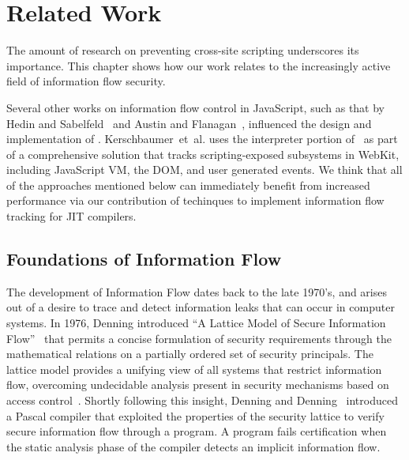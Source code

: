 \chapter{Related Work}\label{ch:related work}

The amount of research on preventing cross-site scripting underscores its importance.
This chapter shows how our work relates to the increasingly active field of information flow security.

Several other works on information flow control in JavaScript, such as that by Hedin and Sabelfeld~\cite{hedin.sabelfeld+12} and Austin and Flanagan~\cite{austin.flanagan+09,austin.flanagan+10,austin.flanagan+12}, influenced the design and implementation of \JitFlow.
Kerschbaumer~et~al.\cite{kerschbaumer.etal+13} uses the interpreter portion of \JitFlow\ as part of a comprehensive solution that tracks scripting-exposed subsystems in WebKit, including JavaScript VM, the DOM, and user generated events.
We think that all of the approaches mentioned below can immediately benefit from increased performance via our contribution of techinques to implement information flow tracking for JIT compilers.


\section{Foundations of Information Flow}


The development of Information Flow dates back to the late 1970's, and arises out of a desire to trace and detect information leaks that can occur in computer systems.
In 1976, Denning introduced ``A Lattice Model of Secure Information Flow''~\cite{denning+76} that permits a concise formulation of security requirements through the mathematical relations on a partially ordered set of security principals.
The lattice model provides a unifying view of all systems that restrict information flow, overcoming undecidable analysis present in security mechanisms based on access control~\cite{lampson+74}.
Shortly following this insight, Denning and Denning~\cite{denning.denning+77} introduced a Pascal compiler that exploited the properties of the security lattice to verify secure information flow through a program.
A program fails certification when the static analysis phase of the compiler detects an implicit information flow.

